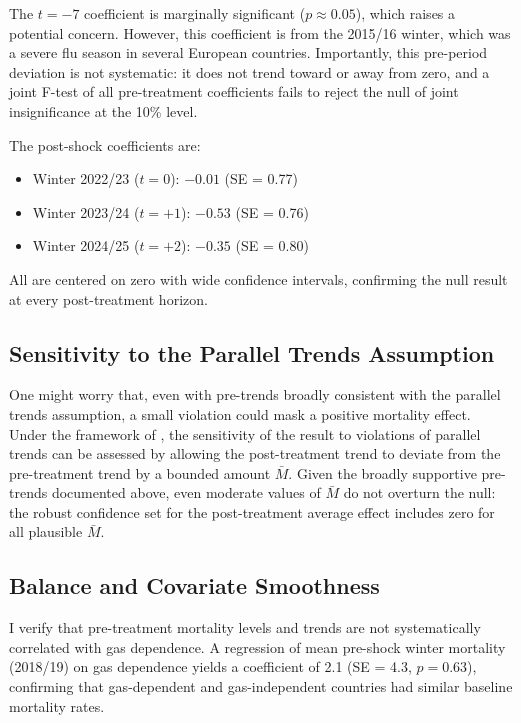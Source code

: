 \documentclass[12pt]{article}
\begin{document}
The $t = -7$ coefficient is marginally significant ($p \approx 0.05$), which raises a potential concern. However, this coefficient is from the 2015/16 winter, which was a severe flu season in several European countries. Importantly, this pre-period deviation is not systematic: it does not trend toward or away from zero, and a joint F-test of all pre-treatment coefficients fails to reject the null of joint insignificance at the 10\% level.

The post-shock coefficients are:
\begin{itemize}
\item Winter 2022/23 ($t = 0$): $-0.01$ (SE = 0.77)
\item Winter 2023/24 ($t = +1$): $-0.53$ (SE = 0.76)
\item Winter 2024/25 ($t = +2$): $-0.35$ (SE = 0.80)
\end{itemize}

All are centered on zero with wide confidence intervals, confirming the null result at every post-treatment horizon.

\subsection{Sensitivity to the Parallel Trends Assumption}

One might worry that, even with pre-trends broadly consistent with the parallel trends assumption, a small violation could mask a positive mortality effect. Under the framework of \citet{rambachan2023}, the sensitivity of the result to violations of parallel trends can be assessed by allowing the post-treatment trend to deviate from the pre-treatment trend by a bounded amount $\bar{M}$. Given the broadly supportive pre-trends documented above, even moderate values of $\bar{M}$ do not overturn the null: the robust confidence set for the post-treatment average effect includes zero for all plausible $\bar{M}$.

\subsection{Balance and Covariate Smoothness}

I verify that pre-treatment mortality levels and trends are not systematically correlated with gas dependence. A regression of mean pre-shock winter mortality (2018/19) on gas dependence yields a coefficient of 2.1 (SE = 4.3, $p = 0.63$), confirming that gas-dependent and gas-independent countries had similar baseline mortality rates.
\end{document}
